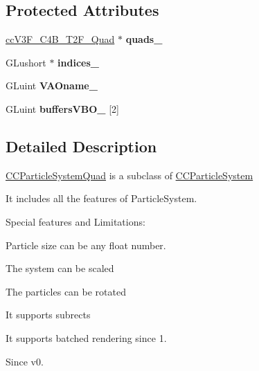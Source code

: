 \subsection*{Protected Attributes}
\begin{DoxyCompactItemize}
\item 
\hypertarget{interface_c_c_particle_system_quad_a2c3b4c688381291bdcad081f756b2ff2}{\hyperlink{cc_types_8h_ab2642984bbb3d2fa1fe4fedb5657a065}{cc\-V3\-F\-\_\-\-C4\-B\-\_\-\-T2\-F\-\_\-\-Quad} $\ast$ {\bfseries quads\-\_\-}}\label{interface_c_c_particle_system_quad_a2c3b4c688381291bdcad081f756b2ff2}

\item 
\hypertarget{interface_c_c_particle_system_quad_af75abd5780bb5d12e69c18515aeae49a}{G\-Lushort $\ast$ {\bfseries indices\-\_\-}}\label{interface_c_c_particle_system_quad_af75abd5780bb5d12e69c18515aeae49a}

\item 
\hypertarget{interface_c_c_particle_system_quad_aecbe47c91ff6aaa0aa54a847df7cf39b}{G\-Luint {\bfseries V\-A\-Oname\-\_\-}}\label{interface_c_c_particle_system_quad_aecbe47c91ff6aaa0aa54a847df7cf39b}

\item 
\hypertarget{interface_c_c_particle_system_quad_a3f3f78a189c0d89a2eeaad8dac86d5aa}{G\-Luint {\bfseries buffers\-V\-B\-O\-\_\-} \mbox{[}2\mbox{]}}\label{interface_c_c_particle_system_quad_a3f3f78a189c0d89a2eeaad8dac86d5aa}

\end{DoxyCompactItemize}


\subsection{Detailed Description}
\hyperlink{interface_c_c_particle_system_quad}{C\-C\-Particle\-System\-Quad} is a subclass of \hyperlink{interface_c_c_particle_system}{C\-C\-Particle\-System}

It includes all the features of Particle\-System.

Special features and Limitations\-:
\begin{DoxyItemize}
\item Particle size can be any float number.
\item The system can be scaled
\item The particles can be rotated
\item It supports subrects
\item It supports batched rendering since 1. \begin{DoxySince}{Since}
v0. 
\end{DoxySince}

\end{DoxyItemize}

